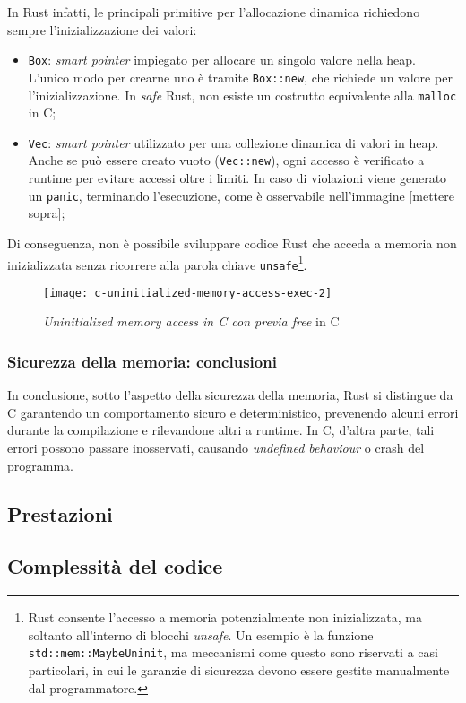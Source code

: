 In Rust infatti, le principali primitive per l'allocazione dinamica richiedono sempre l'inizializzazione dei valori:
\begin{itemize}
    \item \texttt{Box}: \textit{smart pointer} impiegato per allocare un singolo valore nella heap. L'unico modo per crearne uno è tramite \texttt{Box::new}, che richiede un valore per l'inizializzazione. In \textit{safe} Rust, non esiste un costrutto equivalente alla \texttt{malloc} in C;\ 
    \item \texttt{Vec}: \textit{smart pointer} utilizzato per una collezione dinamica di valori in heap. Anche se può essere creato vuoto (\texttt{Vec::new}), ogni accesso è verificato a runtime per evitare accessi oltre i limiti. In caso di violazioni viene generato un \texttt{panic}, terminando l'esecuzione, come è osservabile nell'immagine [mettere sopra];
\end{itemize}
Di conseguenza, non è possibile sviluppare codice Rust che acceda a memoria non inizializzata senza ricorrere alla parola chiave \texttt{unsafe}\footnote{Rust consente l'accesso a memoria potenzialmente non inizializzata, ma soltanto all'interno di blocchi \textit{unsafe}. Un esempio è la funzione \texttt{std::mem::MaybeUninit}, ma meccanismi come questo sono riservati a casi particolari, in cui le garanzie di sicurezza devono essere gestite manualmente dal programmatore.}.
\begin{figure}[htbp]
\begin{center}
    \texttt{[image: c-uninitialized-memory-access-exec-2]}
    \caption{\textit{Uninitialized memory access in C con previa free} in C}\label{c:uninitialized-memory-access-exec-2}
    \end{center}
\end{figure}

\subsubsection{Sicurezza della memoria: conclusioni}
In conclusione, sotto l'aspetto della sicurezza della memoria, Rust si distingue da C garantendo un comportamento sicuro e deterministico, prevenendo
alcuni errori durante la compilazione e rilevandone altri a runtime. In C, d'altra parte, tali errori possono passare inosservati, causando
\textit{undefined behaviour} o crash del programma.


\subsection{Prestazioni}
\subsection{Complessità del codice}
